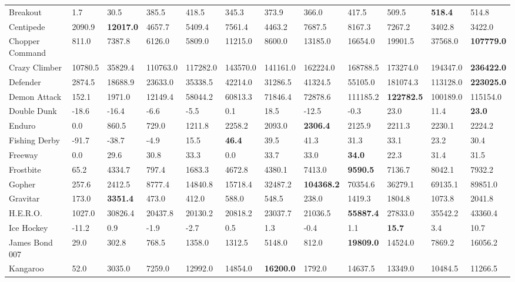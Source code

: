 \documentclass{article}
\begin{document}
\begin{table}[h]
\begin{scriptsize}
\begin{sc}
\begin{tabular}{| p{2.4cm} p{0.84cm} p{0.84cm} p{0.84cm} p{0.84cm} p{0.84cm} p{0.84cm} p{0.84cm} p{0.84cm} p{0.84cm} p{0.84cm} p{0.84cm} |}
Breakout & 1.7 & 30.5 & 385.5 & 418.5 & 345.3 & 373.9 & 366.0 & 417.5 & 509.5 & {\bf 518.4} & 514.8\\
Centipede & 2090.9 & {\bf 12017.0} & 4657.7 & 5409.4 & 7561.4 & 4463.2 & 7687.5 & 8167.3 & 7267.2 & 3402.8 & 3422.0\\
Chopper Command & 811.0 & 7387.8 & 6126.0 & 5809.0 & 11215.0 & 8600.0 & 13185.0 & 16654.0 & 19901.5 & 37568.0 & {\bf 107779.0}\\
Crazy Climber & 10780.5 & 35829.4 & 110763.0 & 117282.0 & 143570.0 & 141161.0 & 162224.0 & 168788.5 & 173274.0 & 194347.0 & {\bf 236422.0}\\
Defender & 2874.5 & 18688.9 & 23633.0 & 35338.5 & 42214.0 & 31286.5 & 41324.5 & 55105.0 & 181074.3 & 113128.0 & {\bf 223025.0}\\
Demon Attack & 152.1 & 1971.0 & 12149.4 & 58044.2 & 60813.3 & 71846.4 & 72878.6 & 111185.2 & {\bf 122782.5} & 100189.0 & 115154.0\\
Double Dunk & -18.6 & -16.4 & -6.6 & -5.5 & 0.1 & 18.5 & -12.5 & -0.3 & 23.0 & 11.4 & {\bf 23.0}\\
Enduro & 0.0 & 860.5 & 729.0 & 1211.8 & 2258.2 & 2093.0 & {\bf 2306.4} & 2125.9 & 2211.3 & 2230.1 & 2224.2\\
Fishing Derby & -91.7 & -38.7 & -4.9 & 15.5 & {\bf 46.4} & 39.5 & 41.3 & 31.3 & 33.1 & 23.2 & 30.4\\
Freeway & 0.0 & 29.6 & 30.8 & 33.3 & 0.0 & 33.7 & 33.0 & {\bf 34.0} & 22.3 & 31.4 & 31.5\\
Frostbite & 65.2 & 4334.7 & 797.4 & 1683.3 & 4672.8 & 4380.1 & 7413.0 & {\bf 9590.5} & 7136.7 & 8042.1 & 7932.2\\
Gopher & 257.6 & 2412.5 & 8777.4 & 14840.8 & 15718.4 & 32487.2 & {\bf 104368.2} & 70354.6 & 36279.1 & 69135.1 & 89851.0\\
Gravitar & 173.0 & {\bf 3351.4} & 473.0 & 412.0 & 588.0 & 548.5 & 238.0 & 1419.3 & 1804.8 & 1073.8 & 2041.8\\
H.E.R.O. & 1027.0 & 30826.4 & 20437.8 & 20130.2 & 20818.2 & 23037.7 & 21036.5 & {\bf 55887.4} & 27833.0 & 35542.2 & 43360.4\\
Ice Hockey & -11.2 & 0.9 & -1.9 & -2.7 & 0.5 & 1.3 & -0.4 & 1.1 & {\bf 15.7} & 3.4 & 10.7\\
James Bond 007 & 29.0 & 302.8 & 768.5 & 1358.0 & 1312.5 & 5148.0 & 812.0 & {\bf 19809.0} & 14524.0 & 7869.2 & 16056.2\\
Kangaroo & 52.0 & 3035.0 & 7259.0 & 12992.0 & 14854.0 & {\bf 16200.0} & 1792.0 & 14637.5 & 13349.0 & 10484.5 & 11266.5\\

\end{tabular}
\end{sc}
\end{scriptsize}
\end{table}
\end{document}

